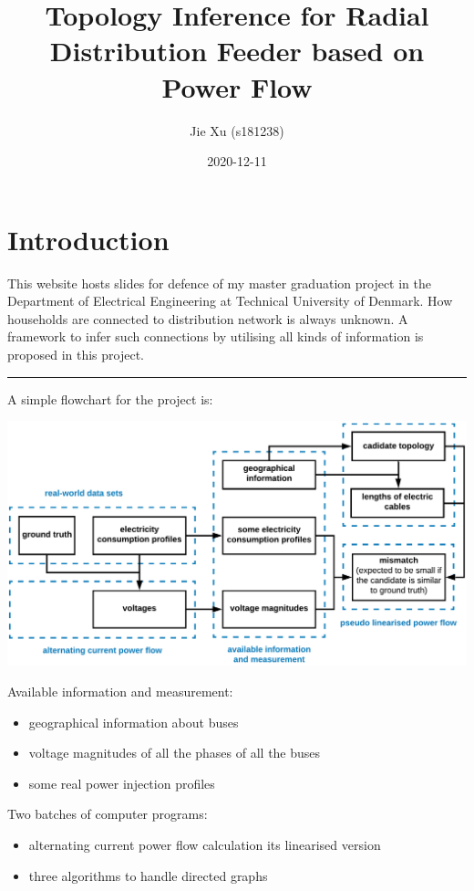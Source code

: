\documentclass[
]{book}
\title{Topology Inference for Radial Distribution Feeder based on Power Flow}
\author{Jie Xu (s181238)}
\date{2020-12-11}
\providecommand{\tightlist}{%
  \setlength{\itemsep}{0pt}\setlength{\parskip}{0pt}}
\begin{document}
\maketitle

{
\setcounter{tocdepth}{1}
\tableofcontents
}
\hypertarget{introduction}{%
\chapter{Introduction}\label{introduction}}

This website hosts slides for defence of my master graduation project in the
Department of Electrical Engineering at Technical University of Denmark. How
households are connected to distribution network is always unknown. A framework
to infer such connections by utilising all kinds of information is proposed in
this project.

\begin{center}\rule{0.5\linewidth}{0.5pt}\end{center}

A simple flowchart for the project is:

\includegraphics{Pictures/figFlowchartSimple.png}

Available information and measurement:

\begin{itemize}
\tightlist
\item
  geographical information about buses
\item
  voltage magnitudes of all the phases of all the buses
\item
  some real power injection profiles
\end{itemize}

Two batches of computer programs:

\begin{itemize}
\tightlist
\item
  alternating current power flow calculation its linearised version
\item
  three algorithms to handle directed graphs
\end{itemize}
\end{document}
